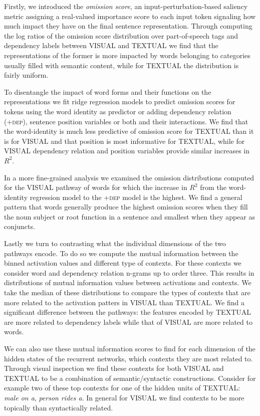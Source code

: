  Firstly, we introduced the \emph{omission score}, an input-perturbation-based saliency metric assigning a 
 real-valued importance score to each input token signaling how much impact  they have on 
 the final sentence representation. Through computing the 
 log ratios of the omission score distribution over part-of-speech tags and dependency labels between
 \textsc{VISUAL} and \textsc{TEXTUAL} we find that 	the representations of the former
 is more impacted by words belonging to categories
 usually filled with semantic content, 
 while for \textsc{TEXTUAL} the distribution is fairly uniform.
 
 To disentangle the impact of word forms and their functions on the representations 
 we fit ridge regression models 
 to predict omission scores for tokens using the word
 identity as predictor or adding dependency relation (\textsc{+dep}), 
 sentence position variables or both and their interactions. 
 We find that the word-identity is much less predictive of omission score for \textsc{TEXTUAL}
 than it is for  \textsc{VISUAL} and that position is most informative for \textsc{TEXTUAL},
 while for \textsc{VISUAL} dependency relation and position variables provide similar increases
 in $R^2$. 
 
 In a more fine-grained analysis we examined the omission distributions
 computed for the \textsc{VISUAL} pathway of words for which the increase in 
 $R^2$ from the word-identity regression model to the \textsc{+dep} model is the highest.
 We find a general pattern that words generally produce the highest omission scores
 when they fill the noun subject or root function in a sentence and smallest when they appear 
 as conjuncts.

Lastly we turn to contrasting what the individual dimensions of the two pathways encode.
To do so we compute the mutual information between the binned activation values and different
type of contexts. For these contexts we consider word and dependency relation n-grams up to
order three. This results in distributions of mutual information values between activations and
contexts. We take the median of these distributions to compare the types of contexts that
are more related to the activation patters in  \textsc{VISUAL} than  \textsc{TEXTUAL}. We find
a significant difference between the pathways: the features encoded by  \textsc{TEXTUAL} are
more related to dependency labels while that of \textsc{VISUAL} are more related to words.

We can also use these mutual information scores to find for each dimension of the hidden states
of the recurrent networks, which contexts they are most related to. 
Through visual inspection we find these contexts for both 
\textsc{VISUAL} and \textsc{TEXTUAL} to be a combination of semantic/syntactic constructions. 
Consider for example two of these
top contexts for one of the hidden units of  \textsc{TEXTUAL}: \emph{male on a}, \emph{person rides a}.
In general for \textsc{VISUAL} we find contexts to be more topically than syntactically related.

